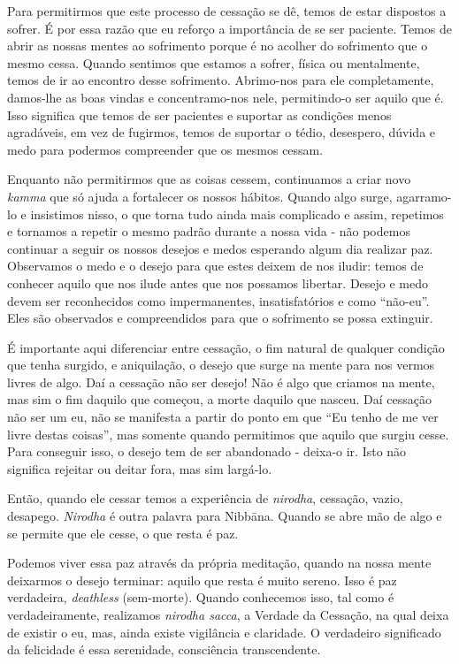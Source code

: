 Para permitirmos que este processo de cessação se dê, temos de estar dispostos a
sofrer. É por essa razão que eu reforço a importância de se ser paciente. Temos
de abrir as nossas mentes ao sofrimento porque é no acolher do sofrimento que o
mesmo cessa. Quando sentimos que estamos a sofrer, física ou mentalmente, temos
de ir ao encontro desse sofrimento. Abrimo-nos para ele completamente, damos-lhe
as boas vindas e concentramo-nos nele, permitindo-o ser aquilo que é. Isso
significa que temos de ser pacientes e suportar as condições menos agradáveis,
em vez de fugirmos, temos de suportar o tédio, desespero, dúvida e medo para
podermos compreender que os mesmos cessam.

Enquanto não permitirmos que as coisas cessem, continuamos a criar novo
\emph{kamma} que só ajuda a fortalecer os nossos hábitos. Quando algo surge,
agarramo-lo e insistimos nisso, o que torna tudo ainda mais complicado e assim,
repetimos e tornamos a repetir o mesmo padrão durante a nossa vida - não podemos
continuar a seguir os nossos desejos e medos esperando algum dia realizar paz.
Observamos o medo e o desejo para que estes deixem de nos iludir: temos de
conhecer aquilo que nos ilude antes que nos possamos libertar. Desejo e medo
devem ser reconhecidos como impermanentes, insatisfatórios e como “não-eu”. Eles
são observados e compreendidos para que o sofrimento se possa extinguir.

É importante aqui diferenciar entre cessação, o fim natural de qualquer condição
que tenha surgido, e aniquilação, o desejo que surge na mente para nos vermos
livres de algo. Daí a cessação não ser desejo! Não é algo que criamos na mente,
mas sim o fim daquilo que começou, a morte daquilo que nasceu. Daí cessação não
ser um eu, não se manifesta a partir do ponto em que “Eu tenho de me ver livre
destas coisas”, mas somente quando permitimos que aquilo que surgiu cesse. Para
conseguir isso, o desejo tem de ser abandonado - deixa-o ir. Isto não significa
rejeitar ou deitar fora, mas sim largá-lo.

Então, quando ele cessar temos a experiência de \emph{nirodha}, cessação, vazio,
desapego. \emph{Nirodha} é outra palavra para Nibbāna. Quando se abre mão
de algo e se permite que ele cesse, o que resta é paz.

Podemos viver essa paz através da própria meditação, quando na nossa mente
deixarmos o desejo terminar: aquilo que resta é muito sereno. Isso é paz
verdadeira, \emph{deathless} (sem-morte). Quando conhecemos isso, tal como é
verdadeiramente, realizamos \emph{nirodha sacca}, a Verdade da Cessação, na qual
deixa de existir o eu, mas, ainda existe vigilância e claridade. O verdadeiro
significado da felicidade é essa serenidade, consciência transcendente.

